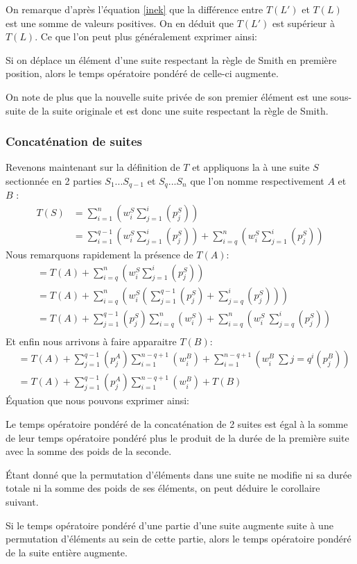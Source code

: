 On remarque d'après l'équation \eqref{inek} que la différence entre $T(L')$ et 
$T(L)$ est une somme de valeurs positives. On en déduit que $T(L')$ est 
supérieur à $T(L)$. Ce que l'on peut plus généralement exprimer ainsi:
\begin{lem}\label{lem1}
Si on déplace un élément d'une suite respectant la règle de Smith en première 
position, alors le temps opératoire pondéré de celle-ci augmente.
\end{lem}
On note de plus que la nouvelle suite privée de son premier élément est une 
sous-suite de la suite originale et est donc une suite respectant la règle de 
Smith.

\subsubsection{Concaténation de suites}
Revenons maintenant sur la définition de $T$ et appliquons la à une suite $S$ 
sectionnée en 2 parties $S_1...S_{q-1}$ et $S_q...S_n$ que l'on nomme 
respectivement $A$ et $B$ :
\begin{align}
T(S) &= \sum_{i=1}^n \left(w^S_i\sum_{j=1}^i\left(p^S_j\right)\right) \\
&= \sum_{i=1}^{q-1} \left(w^S_i\sum_{j=1}^i\left(p^S_j\right)\right) 
+ \sum_{i=q}^n \left(w^S_i\sum_{j=1}^i\left(p^S_j\right)\right)
\end{align}
Nous remarquons rapidement la présence de $T(A)$:
\begin{align}
&= T(A) + \sum_{i=q}^n \left(w^S_i\sum_{j=1}^i\left(p^S_j\right)\right) \\
&= T(A) + \sum_{i=q}^n \left(w^S_i\left( \sum_{j=1}^{q-1}\left(p^S_j\right) 
+  \sum_{j=q}^i\left(p^S_j\right) \right)\right) \\
&= T(A) + \sum_{j=1}^{q-1}\left(p^S_j\right) \sum_{i=q}^n \left(w^S_i\right) +
\sum_{i=q}^n \left(w^S_i\ \sum_{j=q}^i\left(p^S_j\right)\right) \\
\end{align}
Et enfin nous arrivons à faire apparaitre $T(B)$:
\begin{align}
&=  T(A) + \sum_{j=1}^{q-1}\left(p^A_j\right) \sum_{i=1}^{n-q+1} 
\left(w^B_i\right) +
\sum_{i=1}^{n-q+1} \left(w^B_i\ \sum{j=q}^i\left(p^B_j\right)\right) \\
&= T(A) + \sum_{j=1}^{q-1}\left(p^A_j\right) \sum_{i=1}^{n-q+1} 
\left(w^B_i\right) + T(B)
\end{align}
Équation que nous pouvons exprimer ainsi:
\begin{lem}\label{lem2}
Le temps opératoire pondéré de la concaténation de 2 suites est égal à la somme  
de leur temps opératoire pondéré plus le produit de la durée de la première 
suite avec la somme des poids de la seconde.\end{lem}
Étant donné que la permutation d'éléments dans une suite ne modifie ni sa durée 
totale ni la somme des poids de ses éléments, on peut déduire le corollaire 
suivant.
\begin{cor}\label{lem3}
Si le temps opératoire pondéré d'une partie d'une suite augmente suite à une 
permutation d'éléments au sein de cette partie, alors le temps opératoire 
pondéré de la suite entière augmente.
\end{cor}
